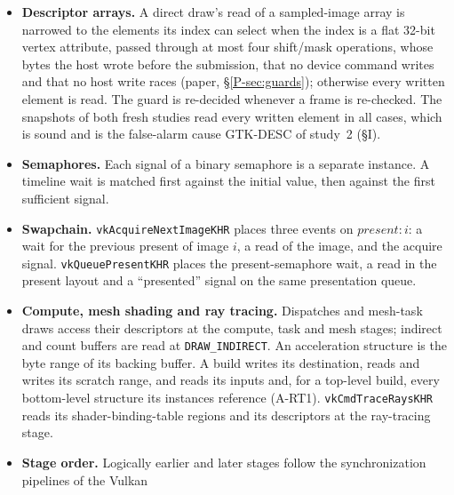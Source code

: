 \documentclass[acmtog,anonymous,review]{acmart}
\newcommand{\bench}{GPUBugBench\xspace}
\newcommand{\code}[1]{\texttt{#1}}
\begin{document}
\begin{itemize}
  every storage descriptor it binds is taken as written at every stage, and the gap is recorded (``shader code not
  available'' or ``shader accesses not attributed''), so the check is not guarantee-eligible. The same gap is
  recorded when an instruction outside the inventory of memory effects (Table~\ref{tab:s-effects}) takes a
  descriptor pointer or handle as an operand. A descriptor access is
  charged at the stages whose entry point uses the binding; the set layout's stage flags are only the fallback when
  no entry point is known. (The snapshots up to engine study 3 charged every stage the layout granted, which is sound
  but caused a false alarm on \bench case 94.)
\item \textbf{Descriptor arrays.} A direct draw's read of a sampled-image array is narrowed to the elements its index
  can select when the index is a flat 32-bit vertex attribute, passed through at most four shift/mask operations,
  whose bytes the host wrote before the submission, that no device command writes and that no host write races
  (paper, \S\ref{P-sec:guards}); otherwise every written element is read. The guard is re-decided whenever a frame is
  re-checked. The snapshots of both fresh studies read every written element in all cases, which is sound and is the
  false-alarm cause GTK-DESC of study~2 (\S I).
\item \textbf{Semaphores.} Each signal of a binary semaphore is a separate instance. A timeline wait is matched first
  against the initial value, then against the first sufficient signal.
\item \textbf{Swapchain.} \code{vkAcquireNextImageKHR} places three events on $\mathit{present}{:}i$: a wait for the
  previous present of image $i$, a read of the image, and the acquire signal. \code{vkQueuePresentKHR} places the
  present-semaphore wait, a read in the present layout and a ``presented'' signal on the same presentation queue.
\item \textbf{Compute, mesh shading and ray tracing.} Dispatches and mesh-task draws access their descriptors at the
  compute, task and mesh stages; indirect and count buffers are read at \code{DRAW\_INDIRECT}. An acceleration
  structure is the byte range of its backing buffer. A build writes its destination, reads and writes its scratch
  range, and reads its inputs and, for a top-level build, every bottom-level structure its instances reference
  (A-RT1). \code{vkCmdTraceRaysKHR} reads its shader-binding-table regions and its descriptors at the ray-tracing
  stage.
\item \textbf{Stage order.} Logically earlier and later stages follow the synchronization pipelines of the Vulkan

\end{itemize}
\end{document}
